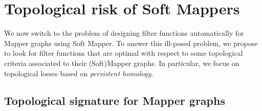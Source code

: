 \section{Topological risk of Soft Mappers}\label{sec:tpological_loss}

We now switch to the problem of designing filter functions automatically for Mapper graphs using Soft Mapper.
To answer this ill-posed problem, we propose to look for filter functions that are optimal with respect to some topological criteria associated to their (Soft)Mapper graphs.
In particular, we focus on topological losses based on {\em persistent homology}.



\subsection{Topological signature for Mapper graphs}
\label{sec:MapPers}


